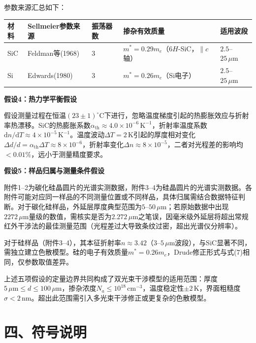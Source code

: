 \documentclass{mcmthesis}
\begin{document}
参数来源汇总如下：

\begin{table}[htbp]
\centering
\begin{tabular}{l l l l l}
\toprule
材料 & Sellmeier参数来源 & 振荡器数 & 掺杂有效质量 & 适用波段 \\
\midrule
SiC & Feldman等(1968) & 3 & $m^*=0.29m_e$（$6H$-SiC，$\parallel c$轴） & $2.5$–$25\,\mu\mathrm{m}$ \\
Si & Edwards(1980) & 3 & $m^*=0.26m_e$（Si电子） & $2.5$–$25\,\mu\mathrm{m}$ \\
\bottomrule
\end{tabular}
\end{table}

\textbf{假设4：热力学平衡假设}

假设测量过程在恒温$(23\pm1)^\circ\mathrm{C}$下进行，忽略温度梯度引起的热膨胀效应与折射率热漂移。SiC的热膨胀系数$\alpha_{\mathrm{th}}\approx4.0\times10^{-6}\,\mathrm{K}^{-1}$，折射率温度系数$\mathrm{d}n/\mathrm{d}T\approx4\times10^{-5}\,\mathrm{K}^{-1}$。温度波动$\Delta T=2\,\mathrm{K}$引起的厚度相对变化$\Delta d/d=\alpha_{\mathrm{th}}\Delta T\approx8\times10^{-6}$，折射率变化$\Delta n\approx8\times10^{-5}$，二者对光程差的影响均$<0.01\%$，远小于测量精度要求。

\textbf{假设5：样品归属与测量条件假设}

附件1–2为碳化硅晶圆片的光谱实测数据，附件3–4为硅晶圆片的光谱实测数据。各附件可能对应同一样品的不同测量位置或不同样品，具体归属需结合数据特征判断。对于碳化硅样品，外延层厚度典型范围为$5$–$50\,\mu\mathrm{m}$；若原始数据中出现$2272\,\mu\mathrm{m}$量级的数值，需核实是否为$2.272\,\mu\mathrm{m}$之笔误，因毫米级外延层将超出常规红外干涉法的最佳测量范围（光程差过大导致条纹过密，超出光谱仪分辨率）。

对于硅样品（附件3–4），其本征折射率$n\approx3.42$（$3$–$5\,\mu\mathrm{m}$波段），与SiC显著不同，需独立建立色散模型。硅的电子有效质量$m^*=0.26m_e$，Drude修正形式与式(7)相同，仅参数取值差异。

上述五项假设的定量边界共同构成了双光束干涉模型的适用范围：厚度$5\,\mu\mathrm{m}\leq d\leq 100\,\mu\mathrm{m}$，掺杂浓度$N_a\leq10^{18}\,\mathrm{cm}^{-3}$，温度稳定性$\pm2\,\mathrm{K}$，界面粗糙度$\sigma<2\,\mathrm{nm}$。超出此范围需引入多光束干涉修正或更复杂的色散模型。


\section{ 四、符号说明}
\end{document}
